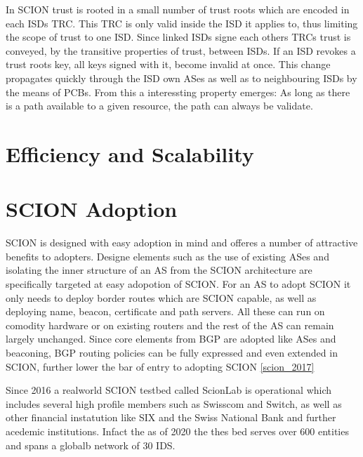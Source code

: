 \documentclass[../eva1_scion.tex]{subfiles}
\begin{document}
    In SCION trust is rooted in a small number of trust roots which are encoded in each ISDs TRC. This TRC is only valid inside the ISD it applies to, thus limiting the scope of trust to one ISD. Since linked ISDs signe each others TRCs trust is conveyed, by the transitive properties of trust, between ISDs. If an ISD revokes a trust roots key, all keys signed with it, become invalid at once. This change propagates quickly through the ISD own ASes as well as to neighbouring ISDs by the means of PCBs. From this a interessting property emerges: As long as there is a path available to a given resource, the path can always be validate.

    \section{Efficiency and Scalability}

    \section{SCION Adoption}
    SCION is designed with easy adoption in mind and offeres a number of attractive benefits to adopters. Designe elements such as the use of existing ASes and isolating the inner structure of an AS from the SCION architecture are specifically targeted at easy adopotion of SCION. For an AS to adopt SCION it only needs to deploy border routes which are SCION capable, as well as deploying name, beacon, certificate and path servers. All these can run on comodity hardware or on existing routers and the rest of the AS can remain largely unchanged. Since core elements from BGP are adopted like ASes and beaconing, BGP routing policies can be fully expressed and even extended in SCION, further lower the bar of entry to adopting SCION \ref{scion_2017}

    Since 2016 a realworld SCION testbed called ScionLab is operational \cite{testbed_2020} which includes several high profile members such as Swisscom and Switch, as well as other financial instatution like SIX and the Swiss National Bank \cite{snb} and further acedemic institutions. Infact the as of 2020 the thes bed serves over 600 entities and spans a globalb network of 30 IDS.
\end{document}
